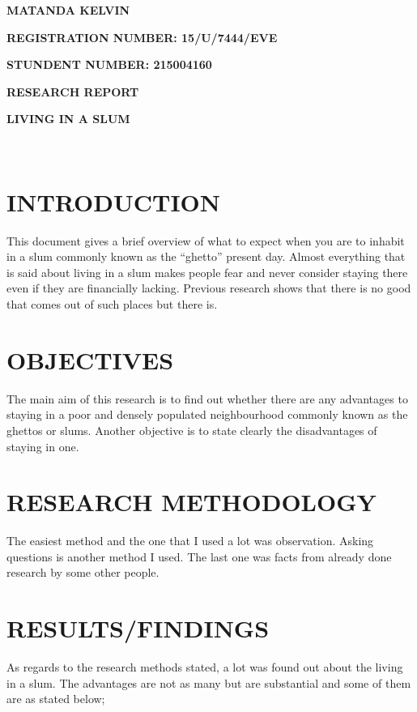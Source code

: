 \documentclass[11pt]{article}
\begin{document}
\textbf{MATANDA KELVIN}


\textbf{REGISTRATION NUMBER: 15/U/7444/EVE}


\textbf{STUNDENT NUMBER: 215004160}


\textbf{RESEARCH REPORT}\\



\begin{huge}\textbf{LIVING IN A SLUM}\end{huge}\\

\section{INTRODUCTION}

This document gives a brief overview of what to expect when you are to inhabit in a slum commonly known as the “ghetto” present day. 
Almost everything that is said about living in a slum makes people fear and never consider staying there even if they are financially lacking. 
Previous research shows that there is no good that comes out of such places but there is.

\section{OBJECTIVES}
The main aim of this research is to find out whether there are any advantages to staying in a poor and densely populated neighbourhood commonly known as the ghettos or slums.
Another objective is to state clearly the disadvantages of staying in one.

\section{RESEARCH METHODOLOGY}
The easiest method and the one that I used a lot was observation.
Asking questions is another method I used.
The last one was facts from already done research by some other people.

\section{RESULTS/FINDINGS}
As regards to the research methods stated, a lot was found out about the living in a slum. 
The advantages are not as many but are substantial and some of them are as stated below;
\end{document}
